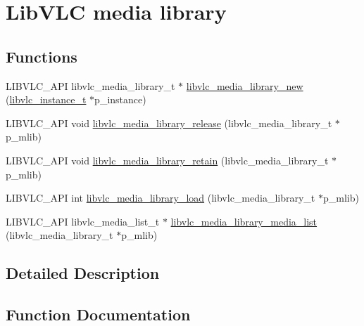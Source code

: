 \hypertarget{group__libvlc__media__library}{}\section{Lib\+V\+LC media library}
\label{group__libvlc__media__library}
\subsection*{Functions}
\begin{DoxyCompactItemize}
\item 
L\+I\+B\+V\+L\+C\+\_\+\+A\+PI libvlc\+\_\+media\+\_\+library\+\_\+t $\ast$ \hyperlink{group__libvlc__media__library_gaa1ae63d96da4224df7d3cdf4ceee37df}{libvlc\+\_\+media\+\_\+library\+\_\+new} (\hyperlink{group__libvlc__core_ga316d739a80da4678206c79f4d6c2e284}{libvlc\+\_\+instance\+\_\+t} $\ast$p\+\_\+instance)
\item 
L\+I\+B\+V\+L\+C\+\_\+\+A\+PI void \hyperlink{group__libvlc__media__library_ga334af602d7829cd26e6a0591fff5bf6d}{libvlc\+\_\+media\+\_\+library\+\_\+release} (libvlc\+\_\+media\+\_\+library\+\_\+t $\ast$p\+\_\+mlib)
\item 
L\+I\+B\+V\+L\+C\+\_\+\+A\+PI void \hyperlink{group__libvlc__media__library_gaecb327371dd64fbd23e77637b32a8091}{libvlc\+\_\+media\+\_\+library\+\_\+retain} (libvlc\+\_\+media\+\_\+library\+\_\+t $\ast$p\+\_\+mlib)
\item 
L\+I\+B\+V\+L\+C\+\_\+\+A\+PI int \hyperlink{group__libvlc__media__library_gaffa7ef77393064821c02c9203031945f}{libvlc\+\_\+media\+\_\+library\+\_\+load} (libvlc\+\_\+media\+\_\+library\+\_\+t $\ast$p\+\_\+mlib)
\item 
L\+I\+B\+V\+L\+C\+\_\+\+A\+PI libvlc\+\_\+media\+\_\+list\+\_\+t $\ast$ \hyperlink{group__libvlc__media__library_gad20c729c7f90d6295bf8a0e350977892}{libvlc\+\_\+media\+\_\+library\+\_\+media\+\_\+list} (libvlc\+\_\+media\+\_\+library\+\_\+t $\ast$p\+\_\+mlib)
\end{DoxyCompactItemize}


\subsection{Detailed Description}


\subsection{Function Documentation}
\mbox{\label{group__libvlc__media__library_gaffa7ef77393064821c02c9203031945f}} 
